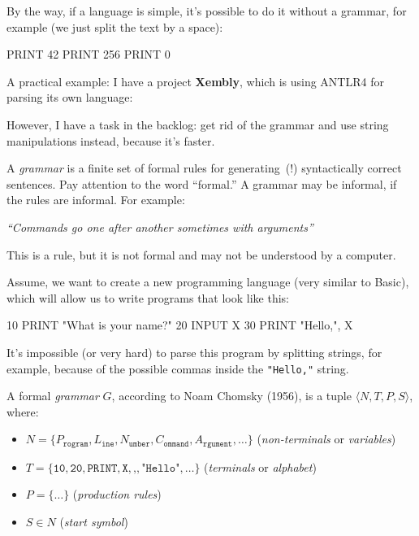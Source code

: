 \documentclass{article}
\begin{document}

\pptToc



By the way, if a language is simple, it's possible to do it without a grammar, for example (we just split the text by a space):
\begin{ffcode}
PRINT 42
PRINT 256
PRINT 0
\end{ffcode}
\plush{}

A practical example: I have a project \textbf{Xembly},
which is using ANTLR4 for parsing its own language:
However, I have a task in the backlog: get rid of the grammar and
use string manipulations instead, because it's faster.
\plush{}

A \emph{grammar} is a finite set of formal rules for generating~(!) syntactically correct sentences. Pay attention to the word ``formal.'' A grammar may be informal, if the rules are informal. For example:

\emph{``Commands go one after another sometimes with arguments''}

This is a rule, but it is not formal and may not be understood by a computer.
\plush{}

Assume, we want to create a new programming language (very similar to Basic), which will allow us to write programs that look like this:
\begin{ffcode}
10 PRINT "What is your name?"
20 INPUT X
30 PRINT "Hello,", X
\end{ffcode}
It's impossible (or very hard) to parse this program by splitting strings, for example, because of the possible commas inside the \texttt{"Hello,"} string.
\plush{}

A formal \emph{grammar} $G$, according to Noam Chomsky (1956), is a tuple $\langle N, T, P, S\rangle$, where:
\begin{itemize}
  \item $N = \{ P_\texttt{rogram}, L_\texttt{ine}, N_\texttt{umber},
    C_\texttt{ommand}, A_\texttt{rgument}, \dots \}$ (\emph{non-terminals} or \emph{variables})
  \item $T = \{ \texttt{10}, \texttt{20},
    \texttt{PRINT}, \texttt{X}, \texttt{,}, \texttt{"Hello"}, \dots \}$ (\emph{terminals} or \emph{alphabet})
  \item $P = \{ \dots \}$ (\emph{production rules})
  \item $S \in N$ (\emph{start symbol})
\end{itemize}
\end{document}
